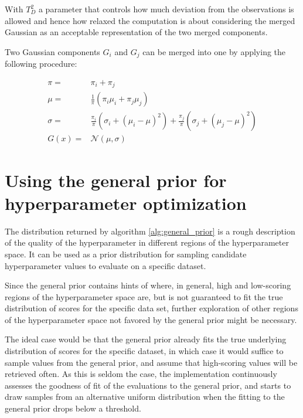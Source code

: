 	With $T_D^2$ a parameter that controls how much deviation from the observations is allowed and
	hence how relaxed the computation is about considering the merged Gaussian as an acceptable
	representation of the two merged components.

	Two Gaussian components $G_i$ and $G_j$ can be merged into one by applying the following
	procedure:

	\begin{align}
		\pi = & \pi_i + \pi_j\\
		\mu = & \frac 1 \pi \left( \pi_i \mu_i + \pi_j \mu_j\right)\\
		\sigma = & \frac {\pi_i} {\pi} \left( \sigma_i + (\mu_i - \mu)^2 \right) + 
			      \frac {\pi_j} \pi \left( \sigma_j + (\mu_j - \mu)^2 \right) \\
				  G(x) = & \mathcal{N}(\mu, \sigma)
				  \label{eq:simplify_gaussians}
	\end{align}
	
	\section{Using the general prior for hyperparameter optimization}

	The distribution returned by algorithm \ref{alg:general_prior} is a rough description of the
	quality of the hyperparameter in different regions of the hyperparameter space. It can be used
	as a prior distribution for sampling candidate hyperparameter values to evaluate on a
	specific dataset.

	Since the general prior contains hints of where, in general, high and low-scoring regions of the
	hyperparameter space are, but is not guaranteed to fit the true distribution of scores for the
	specific data set, further exploration of other regions of the hyperparameter space not
	favored by the general prior might be necessary.
	
	The ideal case would be that the general prior already fits the true underlying distribution of
	scores for the specific dataset, in which case it would suffice to sample values from the
	general prior, and assume that high-scoring values will be retrieved often. As this is seldom
	the case, the implementation continuously assesses the goodness of fit of the evaluations to the
	general prior, and starts to draw samples from an alternative uniform distribution when the
	fitting to the general prior drops below a threshold.


